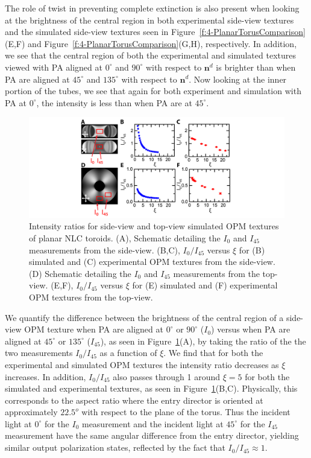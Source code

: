 The role of twist in preventing complete extinction is also present when looking at the brightness of the central region in both experimental side-view textures and the simulated side-view textures seen in Figure~\ref{f:4-PlanarTorusComparison}(E,F) and Figure~\ref{f:4-PlanarTorusComparison}(G,H), respectively.
In addition, we see that the central region of both the experimental and simulated textures viewed with PA aligned at $0^{\circ}$ and $90^{\circ}$ with respect to $\mathbf{n}^d$ is brighter than when PA are aligned at $45^{\circ}$ and $135^{\circ}$ with respect to $\mathbf{n}^d$.
Now looking at the inner portion of the tubes, we see that again for both experiment and simulation with PA at $0^{\circ}$, the intensity is less than when PA are at $45^{\circ}$.
\begin{figure}
\centering
\includegraphics{figures/C4/Ch4-Figs_PlanarSimIntRat.png}
\caption{Intensity ratios for side-view and top-view simulated OPM textures of planar NLC toroids.
(A), Schematic detailing the $I_0$ and $I_{45}$ measurements from the side-view.
(B,C), $I_0/I_{45}$ versus $\xi$ for (B) simulated and (C) experimental OPM textures from the side-view.
(D) Schematic detailing the $I_0$ and $I_{45}$ measurements from the top-view.
(E,F), $I_0/I_{45}$ versus $\xi$ for (E) simulated and (F) experimental OPM textures from the top-view. }\label{f:4-PlanarIntRatio}
\end{figure}

We quantify the difference between the brightness of the central region of a side-view OPM texture when PA are aligned at $0^{\circ}$ or $90^{\circ}$ ($I_0$) versus when PA are aligned at $45^{\circ}$ or $135^{\circ}$ ($I_{45}$), as seen in Figure~\ref{f:4-PlanarIntRatio}(A), by taking the ratio of the the two measurements $I_0/I_{45}$ as a function of $\xi$.
We find that for both the experimental and simulated OPM textures the intensity ratio decreases as $\xi$ increases. In addition, $I_0/I_{45}$ also passes through 1 around $\xi = 5$ for both the simulated and experimental textures, as seen in Figure~\ref{f:4-PlanarIntRatio}(B,C).
Physically, this corresponds to the aspect ratio where the entry director is oriented at approximately $22.5^o$ with respect to the plane of the torus.
Thus the incident light at $0^{\circ}$ for the $I_0$ measurement and the incident light at $45^{\circ}$ for the $I_{45}$ measurement have the same angular difference from the entry director, yielding similar output polarization states, reflected by the fact that $I_0/I_{45} \approx 1$.

